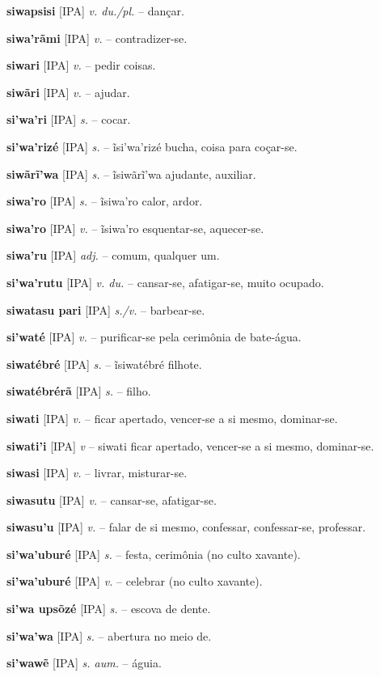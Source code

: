 \textbf{siwapsisi} [IPA] \textit{v. du./pl.} -- dançar.

\textbf{siwa'rãmi} [IPA] \textit{v.} -- contradizer-se.

\textbf{siwari} [IPA] \textit{v.} -- pedir coisas.

\textbf{siwãri} [IPA] \textit{v.} -- ajudar.

\textbf{si'wa'ri} [IPA] \textit{s.} -- cocar.

\textbf{si'wa'rizé} [IPA] \textit{s.} -- ĩsi'wa'rizé bucha, coisa para coçar-se.

\textbf{siwãrĩ'wa} [IPA] \textit{s.} -- ĩsiwãrĩ'wa ajudante, auxiliar.

\textbf{siwa'ro} [IPA] \textit{s.} -- ĩsiwa'ro calor, ardor.

\textbf{siwa'ro} [IPA] \textit{v.} -- ĩsiwa'ro esquentar-se, aquecer-se.

\textbf{siwa'ru} [IPA] \textit{adj.} -- comum, qualquer um.

\textbf{si'wa'rutu} [IPA] \textit{v. du.} -- cansar-se, afatigar-se, muito ocupado.

\textbf{siwatasu pari} [IPA] \textit{s./v.} -- barbear-se.

\textbf{si'waté} [IPA] \textit{v.} -- purificar-se pela cerimônia de bate-água.

\textbf{siwatébré} [IPA] \textit{s.} -- ĩsiwatébré filhote.

\textbf{siwatébrérã} [IPA] \textit{s.} -- filho.

\textbf{siwati} [IPA] \textit{v.} -- ficar apertado, vencer-se a si mesmo, dominar-se.

\textbf{siwati'i} [IPA] \textit{v} -- siwati ficar apertado, vencer-se a si mesmo, dominar-se.

\textbf{siwasi} [IPA] \textit{v.} -- livrar, misturar-se.

\textbf{siwasutu} [IPA] \textit{v.} -- cansar-se, afatigar-se.

\textbf{siwasu'u} [IPA] \textit{v.} -- falar de si mesmo, confessar, confessar-se, professar.

\textbf{si'wa'uburé} [IPA] \textit{s.} -- festa, cerimônia (no culto xavante).

\textbf{si'wa'uburé} [IPA] \textit{v.} -- celebrar (no culto xavante).

\textbf{si'wa upsõzé} [IPA] \textit{s.} -- escova de dente.

\textbf{si'wa'wa} [IPA] \textit{s.} -- abertura no meio de.

\textbf{si'wawẽ} [IPA] \textit{s. aum.} -- águia.


